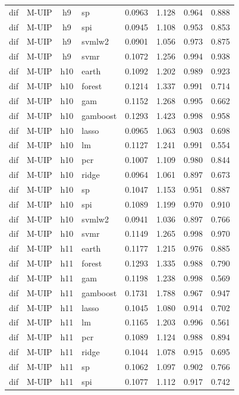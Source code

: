 \begin{ThreePartTable}
\begin{longtable}[t]{llclcccc}
dif & M-UIP & h9 & sp & 0.0963 & 1.128 & 0.964 & 0.888\\
dif & M-UIP & h9 & spi & 0.0945 & 1.108 & 0.953 & 0.853\\
dif & M-UIP & h9 & svmlw2 & 0.0901 & 1.056 & 0.973 & 0.875\\
dif & M-UIP & h9 & svmr & 0.1072 & 1.256 & 0.994 & 0.938\\
\addlinespace
dif & M-UIP & h10 & earth & 0.1092 & 1.202 & 0.989 & 0.923\\
dif & M-UIP & h10 & forest & 0.1214 & 1.337 & 0.991 & 0.714\\
dif & M-UIP & h10 & gam & 0.1152 & 1.268 & 0.995 & 0.662\\
dif & M-UIP & h10 & gamboost & 0.1293 & 1.423 & 0.998 & 0.958\\
dif & M-UIP & h10 & lasso & 0.0965 & 1.063 & 0.903 & 0.698\\
dif & M-UIP & h10 & lm & 0.1127 & 1.241 & 0.991 & 0.554\\
dif & M-UIP & h10 & pcr & 0.1007 & 1.109 & 0.980 & 0.844\\
dif & M-UIP & h10 & ridge & 0.0964 & 1.061 & 0.897 & 0.673\\
dif & M-UIP & h10 & sp & 0.1047 & 1.153 & 0.951 & 0.887\\
dif & M-UIP & h10 & spi & 0.1089 & 1.199 & 0.970 & 0.910\\
dif & M-UIP & h10 & svmlw2 & 0.0941 & 1.036 & 0.897 & 0.766\\
dif & M-UIP & h10 & svmr & 0.1149 & 1.265 & 0.998 & 0.970\\
\addlinespace
dif & M-UIP & h11 & earth & 0.1177 & 1.215 & 0.976 & 0.885\\
dif & M-UIP & h11 & forest & 0.1293 & 1.335 & 0.988 & 0.790\\
dif & M-UIP & h11 & gam & 0.1198 & 1.238 & 0.998 & 0.569\\
dif & M-UIP & h11 & gamboost & 0.1731 & 1.788 & 0.967 & 0.947\\
dif & M-UIP & h11 & lasso & 0.1045 & 1.080 & 0.914 & 0.702\\
dif & M-UIP & h11 & lm & 0.1165 & 1.203 & 0.996 & 0.561\\
dif & M-UIP & h11 & pcr & 0.1089 & 1.124 & 0.988 & 0.894\\
dif & M-UIP & h11 & ridge & 0.1044 & 1.078 & 0.915 & 0.695\\
dif & M-UIP & h11 & sp & 0.1062 & 1.097 & 0.902 & 0.766\\
dif & M-UIP & h11 & spi & 0.1077 & 1.112 & 0.917 & 0.742\\

\end{longtable}
\end{ThreePartTable}
